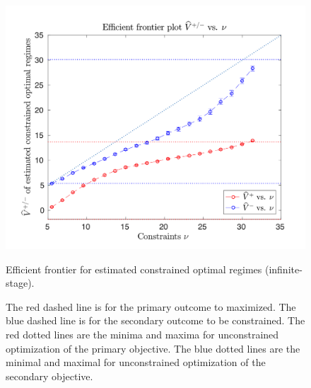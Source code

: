 \documentclass{article}
\begin{document}
\begin{figure}[!htbp]
	\centering
	\includegraphics[width=.9\linewidth]{./figs/efficient_plot.png}
	\caption{Efficient frontier for estimated constrained optimal regimes (infinite-stage).}
	\caption*{The red dashed line is for the primary outcome to maximized. The blue dashed line is for the secondary outcome to be constrained. The red dotted lines are the minima and maxima for unconstrained optimization of the primary objective. The blue dotted lines are the minimal and maximal for unconstrained optimization of the secondary objective.}
	\label{fig:1}
\end{figure}
\end{document}
